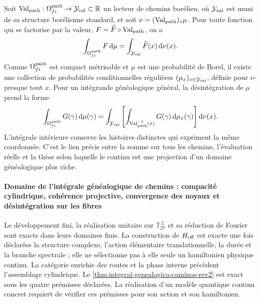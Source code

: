 Soit
\(\operatorname{Val}_{\rm path}:\Omega^{\rm path}_{fi}\to\mathcal Y_{\rm val}\subset\mathbb R\)
un lecteur de chemins borélien, où \(\mathcal Y_{\rm val}\) est muni de sa structure
borélienne standard, et soit
\(\nu=(\operatorname{Val}_{\rm path})_*\mu\). Pour toute fonction qui
se factorise par la valeur, \(F=\widehat F\circ\operatorname{Val}_{\rm path}\),
on a
\[
 \int_{\Omega^{\rm path}_{fi}}F\,\mathrm d\mu
 =\int_{\mathcal Y_{\rm val}}\widehat F(x)\,\mathrm d\nu(x).
\]
Comme \(\Omega^{\rm path}_{fi}\) est compact métrisable et \(\mu\) est une
probabilité de Borel, il existe une collection de probabilités conditionnelles
régulières \((\mu_x)_{x\in\mathcal Y_{\rm val}}\), définie pour \(\nu\)-presque tout \(x\). Pour
un intégrande généalogique général, la désintégration de \(\mu\) prend la forme
\begin{equation}
 \int_{\Omega^{\rm path}_{fi}}G(\gamma)\,\mathrm d\mu(\gamma)
 =\int_{\mathcal Y_{\rm val}}\left[
   \int_{\operatorname{Val}_{\rm path}^{-1}(x)}
   G(\gamma)\,\mathrm d\mu_x(\gamma)
  \right]\mathrm d\nu(x).
 \label{eq:desintegracion-genealogica-caminos-rev2}
\end{equation}
L’intégrale intérieure conserve les histoires distinctes qui expriment la même
coordonnée. C’est le lien précis entre la somme sur tous les chemins,
l’évaluation réelle et la thèse selon laquelle le continu est une projection
d’un domaine généalogique plus riche.

\paragraph{Domaine de l’intégrale généalogique de chemins : compacité cylindrique, cohérence projective, convergence des noyaux et désintégration sur les fibres}
Le développement fini, la réalisation unitaire sur
\(\mathbb T_{27}^{\,2}\) et sa réduction de Fourier sont exacts dans leurs domaines
finis. La construction de \(H_{\rm eff}\) est
exacte une fois déclarées la structure complexe, l’action élémentaire
translationnelle, la durée et la branche spectrale ; elle ne sélectionne pas à elle seule un
hamiltonien physique continu. La catégorie enrichie des routes et la phase
interne précèdent l’assemblage cylindrique. Le
\cref{thm:integral-genealogica-caminos-rev2} est exact sous les quatre
prémisses déclarées. La réalisation d’un modèle quantique continu concret
requiert de vérifier ces prémisses pour son action et son hamiltonien.

